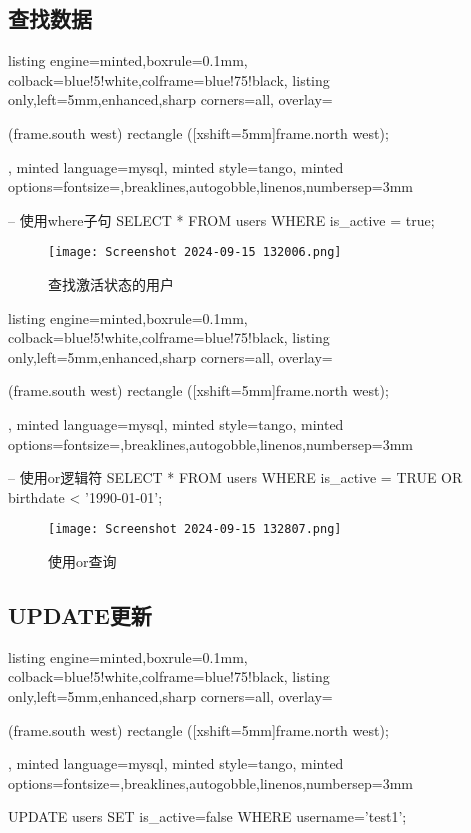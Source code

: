 \documentclass[12pt]{article}
\begin{document}
\subsection{查找数据}
\begin{tcblisting}{listing engine=minted,boxrule=0.1mm,
colback=blue!5!white,colframe=blue!75!black,
listing only,left=5mm,enhanced,sharp corners=all,
overlay={\begin{tcbclipinterior} (frame.south west)
rectangle ([xshift=5mm]frame.north west);\end{tcbclipinterior}},
minted language=mysql,
minted style=tango,
minted options={fontsize=\small,breaklines,autogobble,linenos,numbersep=3mm}}
-- 使用where子句
SELECT * FROM users WHERE is_active = true;
\end{tcblisting}
\begin{figure}[htbp]
    \centering
    \texttt{[image: Screenshot 2024-09-15 132006.png]}
    \caption{查找激活状态的用户}
    \label{fig:enter-label}
\end{figure}

\begin{tcblisting}{listing engine=minted,boxrule=0.1mm,
colback=blue!5!white,colframe=blue!75!black,
listing only,left=5mm,enhanced,sharp corners=all,
overlay={\begin{tcbclipinterior} (frame.south west)
rectangle ([xshift=5mm]frame.north west);\end{tcbclipinterior}},
minted language=mysql,
minted style=tango,
minted options={fontsize=\small,breaklines,autogobble,linenos,numbersep=3mm}}
-- 使用or逻辑符
SELECT * FROM users WHERE is_active = TRUE OR birthdate < '1990-01-01';
\end{tcblisting}
\begin{figure}[htbp]
    \centering
    \texttt{[image: Screenshot 2024-09-15 132807.png]}
    \caption{使用or查询}
    \label{fig:enter-label}
\end{figure}

\subsection{UPDATE更新}
\begin{tcblisting}{listing engine=minted,boxrule=0.1mm,
colback=blue!5!white,colframe=blue!75!black,
listing only,left=5mm,enhanced,sharp corners=all,
overlay={\begin{tcbclipinterior} (frame.south west)
rectangle ([xshift=5mm]frame.north west);\end{tcbclipinterior}},
minted language=mysql,
minted style=tango,
minted options={fontsize=\small,breaklines,autogobble,linenos,numbersep=3mm}}
UPDATE users
SET is_active=false
WHERE username='test1';
\end{tcblisting}
\end{document}
